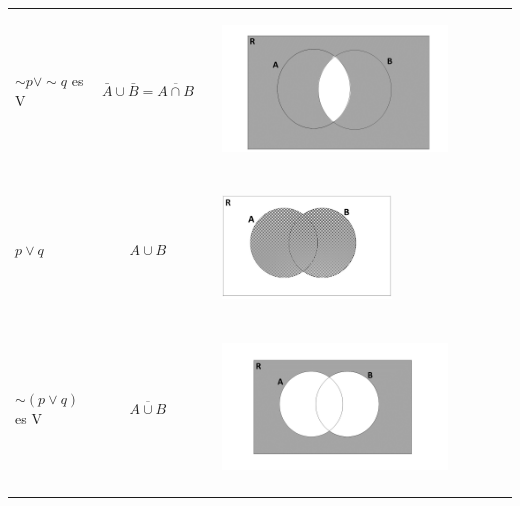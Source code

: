 \documentclass[12pt]{article}
\theoremstyle{definition}
\theoremstyle{remark}
\begin{document}
\begin{enumerate}
\begin{table}[ H]
\begin{center}
\begin{tabular} { l c c l }
$\sim p  \vee \sim q$ es V & $\bar{A}\cup \bar{B} = \overline{A\cap B}$ & &
\begin{minipage}{5cm} 
\begin{center} 
\includegraphics[width=0.8\textwidth]{11c.png} 
\end{center}
\end{minipage}\\ \\

  
$ p \vee q$ &$A \cup B$&  & 
\begin{minipage}{5cm} 
\begin{center} 
\includegraphics[width=0.6\textwidth]{TP1Fig5.jpg} 
\end{center}
\end{minipage}\\ \\ 

$\sim (p \vee q)$ es V & $\overline{A\cup B}$& & 
\begin{minipage}{5cm} 
\begin{center} 
\includegraphics[width=0.8\textwidth]{11d.png} 
\end{center}
\end{minipage}\\ \\   


\end{tabular}
\end{center}
\end{table}
\end{enumerate}
\end{document}
